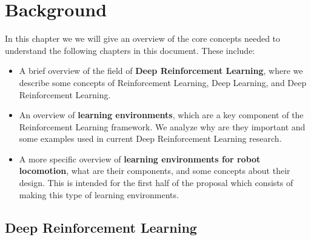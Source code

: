 \chapter{Background}
\label{ch:background}



In this chapter we we will give an overview of the core concepts needed to
understand the following chapters in this document. These include:


\begin{itemize}
    \item A brief overview of the field of \textbf{Deep Reinforcement Learning}, where
          we describe some concepts of Reinforcement Learning, Deep Learning, and Deep
          Reinforcement Learning.
    \item An overview of \textbf{learning environments}, which are a key component of
          the Reinforcement Learning framework. We analyze why are they important 
          and some examples used in current Deep Reinforcement Learning research.
    \item A more specific overview of \textbf{learning environments for robot locomotion}, 
          what are their components, and some concepts about their design. This is
          intended for the first half of the proposal which consists of making this type
          of learning environments.
\end{itemize}


\section{Deep Reinforcement Learning}

